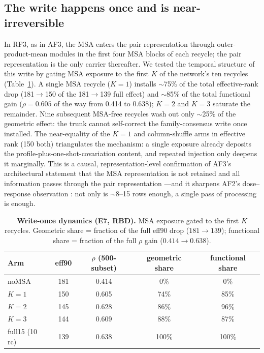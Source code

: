 \documentclass[11pt]{article}
\newcommand{\eff}{eff90}
\begin{document}
\subsection{The write happens once and is near-irreversible}
\label{sec:e7}

In RF3, as in AF3, the MSA enters the pair representation through
outer-product-mean modules in the first four MSA blocks of each recycle; the
pair representation is the only carrier thereafter. We tested the temporal
structure of this write by gating MSA exposure to the first $K$ of the
network's ten recycles (Table~\ref{tab:e7}). A single MSA recycle ($K{=}1$)
installs $\sim$75\% of the total effective-rank drop (181$\to$150 of the
181$\to$139 full effect) and $\sim$85\% of the total functional gain
($\rho=0.605$ of the way from 0.414 to 0.638); $K{=}2$ and $K{=}3$ saturate
the remainder. Nine subsequent MSA-free recycles wash out only $\sim$25\% of
the geometric effect: the trunk cannot self-correct the family-consensus write
once installed. The near-equality of the $K{=}1$ and column-shuffle arms in
effective rank (150 both) triangulates the mechanism: a single exposure
already deposits the profile-plus-one-shot-covariation content, and repeated
injection only deepens it marginally. This is a causal, representation-level
confirmation of AF3's architectural statement that the MSA representation is
not retained and all information passes through the pair representation
\cite{abramson2024}---and it sharpens AF2's dose--response observation
\cite{jumper2021}: not only is $\sim$8--15 rows enough, a single pass of
processing is enough.

\begin{table}[t]
\centering
\caption{\textbf{Write-once dynamics (E7, RBD).} MSA exposure gated to the
first $K$ recycles. Geometric share = fraction of the full \eff{} drop
($181{\to}139$); functional share = fraction of the full $\rho$ gain
($0.414{\to}0.638$).}
\label{tab:e7}
\small
\begin{tabular}{lcccc}
\toprule
Arm & \eff{} & $\rho$ (500-subset) & geometric share & functional share \\
\midrule
noMSA          & 181 & 0.414 & 0\% & 0\% \\
$K{=}1$        & 150 & 0.605 & 74\% & 85\% \\
$K{=}2$        & 145 & 0.628 & 86\% & 96\% \\
$K{=}3$        & 144 & 0.609 & 88\% & 87\% \\
full15 (10 rc) & 139 & 0.638 & 100\% & 100\% \\
\bottomrule
\end{tabular}
\end{table}
\end{document}
